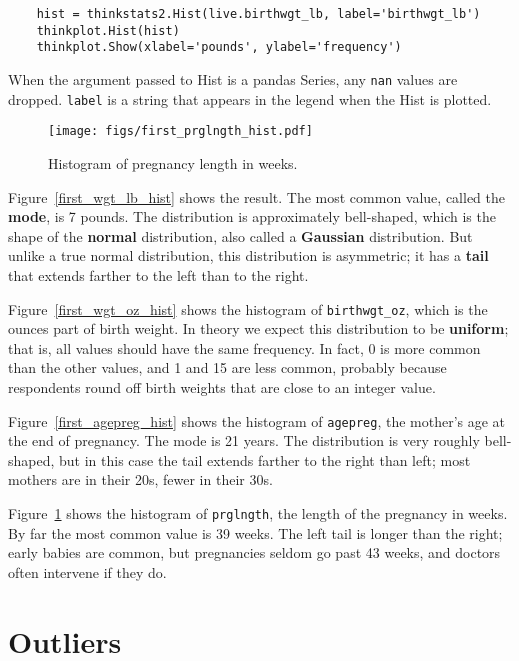 \documentclass[12pt]{book}
\begin{document}
\begin{verbatim}
    hist = thinkstats2.Hist(live.birthwgt_lb, label='birthwgt_lb')
    thinkplot.Hist(hist)
    thinkplot.Show(xlabel='pounds', ylabel='frequency')
\end{verbatim}

When the argument passed to Hist is a pandas Series, any
{\tt nan} values are dropped.  {\tt label} is a string that appears
in the legend when the Hist is plotted.

\begin{figure}
\centerline{\texttt{[image: figs/first\_prglngth\_hist.pdf]}}
\caption{Histogram of pregnancy length in weeks.}
\label{first_prglngth_hist}
\end{figure}

Figure~\ref{first_wgt_lb_hist} shows the result.  The most common
value, called the {\bf mode}, is 7 pounds.  The distribution is
approximately bell-shaped, which is the shape of the {\bf normal}
distribution, also called a {\bf Gaussian} distribution.  But unlike a
true normal distribution, this distribution is asymmetric; it has
a {\bf tail} that extends farther to the left than to the right.

Figure~\ref{first_wgt_oz_hist} shows the histogram of
\verb"birthwgt_oz", which is the ounces part of birth weight.  In
theory we expect this distribution to be {\bf uniform}; that is, all
values should have the same frequency.  In fact, 0 is more common than
the other values, and 1 and 15 are less common, probably because
respondents round off birth weights that are close to an integer
value.

Figure~\ref{first_agepreg_hist} shows the histogram of \verb"agepreg",
the mother's age at the end of pregnancy.  The mode is 21 years.  The
distribution is very roughly bell-shaped, but in this case the tail
extends farther to the right than left; most mothers are in
their 20s, fewer in their 30s.

Figure~\ref{first_prglngth_hist} shows the histogram of
\verb"prglngth", the length of the pregnancy in weeks.  By far the
most common value is 39 weeks.  The left tail is longer than the
right; early babies are common, but pregnancies seldom go past 43
weeks, and doctors often intervene if they do.


\section{Outliers}
\end{document}
